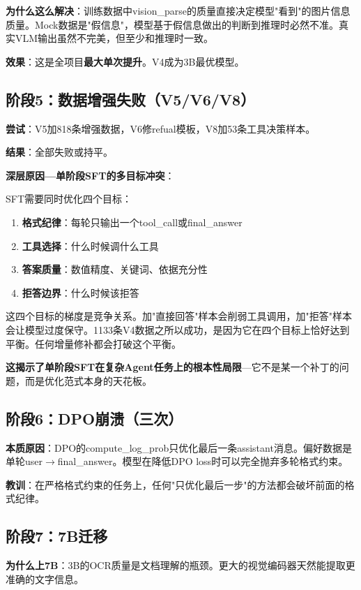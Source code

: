 \documentclass[fontset=none,11pt,a4paper]{ctexart}
\begin{document}
\textbf{为什么这么解决}：训练数据中vision\_parse的质量直接决定模型"看到"的图片信息质量。Mock数据是"假信息"，模型基于假信息做出的判断到推理时必然不准。真实VLM输出虽然不完美，但至少和推理时一致。

\textbf{效果}：这是全项目\textbf{最大单次提升}。V4成为3B最优模型。

\subsection{阶段5：数据增强失败（V5/V6/V8）}

\textbf{尝试}：V5加818条增强数据，V6修refual模板，V8加53条工具决策样本。

\textbf{结果}：全部失败或持平。

\textbf{深层原因---单阶段SFT的多目标冲突}：

SFT需要同时优化四个目标：
\begin{enumerate}[nosep]
    \item \textbf{格式纪律}：每轮只输出一个tool\_call或final\_answer
    \item \textbf{工具选择}：什么时候调什么工具
    \item \textbf{答案质量}：数值精度、关键词、依据充分性
    \item \textbf{拒答边界}：什么时候该拒答
\end{enumerate}

这四个目标的梯度是竞争关系。加"直接回答"样本会削弱工具调用，加"拒答"样本会让模型过度保守。1133条V4数据之所以成功，是因为它在四个目标上恰好达到平衡。任何增量修补都会打破这个平衡。

\textbf{这揭示了单阶段SFT在复杂Agent任务上的根本性局限}---它不是某一个补丁的问题，而是优化范式本身的天花板。

\subsection{阶段6：DPO崩溃（三次）}

\textbf{本质原因}：DPO的compute\_log\_prob只优化最后一条assistant消息。偏好数据是单轮user$\to$final\_answer。模型在降低DPO loss时可以完全抛弃多轮格式约束。

\textbf{教训}：在严格格式约束的任务上，任何"只优化最后一步"的方法都会破坏前面的格式纪律。

\subsection{阶段7：7B迁移}

\textbf{为什么上7B}：3B的OCR质量是文档理解的瓶颈。更大的视觉编码器天然能提取更准确的文字信息。
\end{document}
